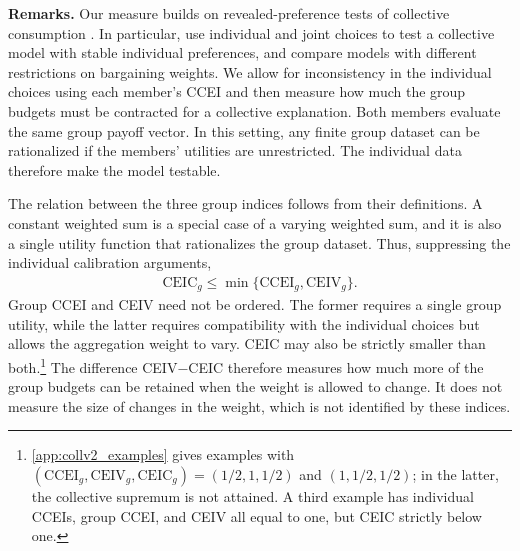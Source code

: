 \documentclass[11 pt]{article}
\begin{document}

\noindent \textbf{Remarks.} Our measure builds on revealed-preference tests of collective consumption \citep{cherchye2007,cherchye2011}. In particular, \citet{cherchye2020caring} use individual and joint choices to test a collective model with stable individual preferences, and \citet{bruyneel2012restricted} compare models with different restrictions on bargaining weights. We allow for inconsistency in the individual choices using each member's CCEI and then measure how much the group budgets must be contracted for a collective explanation. Both members evaluate the same group payoff vector. In this setting, any finite group dataset can be rationalized if the members' utilities are unrestricted. The individual data therefore make the model testable.

The relation between the three group indices follows from their definitions. A constant weighted sum is a special case of a varying weighted sum, and it is also a single utility function that rationalizes the group dataset. Thus, suppressing the individual calibration arguments,
\begin{align}
\mathrm{CEIC}_g\leq\min\{\mathrm{CCEI}_g,\mathrm{CEIV}_g\}.
\label{eqn:collv2_order}
\end{align}
Group CCEI and CEIV need not be ordered. The former requires a single group utility, while the latter requires compatibility with the individual choices but allows the aggregation weight to vary. CEIC may also be strictly smaller than both.\footnote{\autoref{app:collv2_examples} gives examples with $(\mathrm{CCEI}_g,\mathrm{CEIV}_g,\mathrm{CEIC}_g)=(1/2,1,1/2)$ and $(1,1/2,1/2)$; in the latter, the collective supremum is not attained. A third example has individual CCEIs, group CCEI, and CEIV all equal to one, but CEIC strictly below one.} The difference CEIV$-$CEIC therefore measures how much more of the group budgets can be retained when the weight is allowed to change. It does not measure the size of changes in the weight, which is not identified by these indices.
\end{document}
